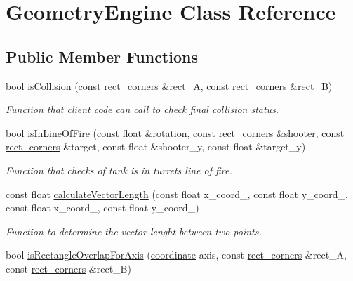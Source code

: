 \hypertarget{class_geometry_engine}{\section{Geometry\+Engine Class Reference}
\label{class_geometry_engine}
}
\subsection*{Public Member Functions}
\begin{DoxyCompactItemize}
\item 
\hypertarget{class_geometry_engine_a049acffe89f53be25fbc9d4018c3b388}{bool \hyperlink{class_geometry_engine_a049acffe89f53be25fbc9d4018c3b388}{is\+Collision} (const \hyperlink{structrect__corners}{rect\+\_\+corners} \&rect\+\_\+\+A, const \hyperlink{structrect__corners}{rect\+\_\+corners} \&rect\+\_\+\+B)}\label{class_geometry_engine_a049acffe89f53be25fbc9d4018c3b388}

\begin{DoxyCompactList}\small\item\em Function that client code can call to check final collision status. \end{DoxyCompactList}\item 
\hypertarget{class_geometry_engine_af21c9c2e172169130af88fa6f3aa5fe7}{bool \hyperlink{class_geometry_engine_af21c9c2e172169130af88fa6f3aa5fe7}{is\+In\+Line\+Of\+Fire} (const float \&rotation, const \hyperlink{structrect__corners}{rect\+\_\+corners} \&shooter, const \hyperlink{structrect__corners}{rect\+\_\+corners} \&target, const float \&shooter\+\_\+y, const float \&target\+\_\+y)}\label{class_geometry_engine_af21c9c2e172169130af88fa6f3aa5fe7}

\begin{DoxyCompactList}\small\item\em Function that checks of tank is in turrets line of fire. \end{DoxyCompactList}\item 
\hypertarget{class_geometry_engine_a99634c40d20ab72ab30289a6ff4abe39}{const float \hyperlink{class_geometry_engine_a99634c40d20ab72ab30289a6ff4abe39}{calculate\+Vector\+Length} (const float x\+\_\+coord\+\_, const float y\+\_\+coord\+\_, const float x\+\_\+coord\+\_, const float y\+\_\+coord\+\_)}\label{class_geometry_engine_a99634c40d20ab72ab30289a6ff4abe39}

\begin{DoxyCompactList}\small\item\em Function to determine the vector lenght between two points. \end{DoxyCompactList}\item 
\hypertarget{class_geometry_engine_a1cd3abed45085b76e4145ac91fd1275e}{bool \hyperlink{class_geometry_engine_a1cd3abed45085b76e4145ac91fd1275e}{is\+Rectangle\+Overlap\+For\+Axis} (\hyperlink{structcoordinate}{coordinate} axis, const \hyperlink{structrect__corners}{rect\+\_\+corners} \&rect\+\_\+\+A, const \hyperlink{structrect__corners}{rect\+\_\+corners} \&rect\+\_\+\+B)}\label{class_geometry_engine_a1cd3abed45085b76e4145ac91fd1275e}


\end{DoxyCompactItemize}

